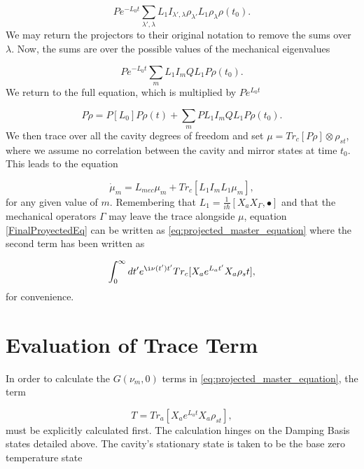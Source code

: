 \documentclass[reprint, amsmath,amssymb, aps,pra]{revtex4-1}
\begin{document}
\begin{equation}
Pe^{-L_0 t} \sum_{\lambda',\lambda} L_1 I_{\lambda',\lambda} \rho_{\lambda'} L_1 \rho_\lambda \rho(t_0).
\end{equation} We may return the projectors to their original notation to remove the sums over $\lambda$.  Now, the sums are over the possible values of the mechanical eigenvalues 

\begin{equation}
Pe^{-L_0 t} \sum_{m} L_1 I_{m} Q L_1 P \rho(t_0).
\end{equation} We return to the full equation, which is multiplied by $Pe^{L_0 t}$ 

\begin{equation}
P\dot{\rho} = P[L_0]P \rho(t) + \sum_{m} P L_1 I_{m} Q L_1 P \rho(t_0).
\end{equation} We then trace over all the cavity degrees of freedom and set  $\mu = Tr_c[P\rho]\otimes \rho_{st}$, where we assume no correlation between the cavity and mirror states at time $t_0$. This leads to the equation

\begin{equation}\label{FinalProyectedEq}
\dot{\mu}_m = L_{mec}\mu_m + Tr_c[ L_1 I_m L_1  \mu_m],
\end{equation} for any given value of $m$. Remembering that $L_1 = \frac{1}{i\hbar}[X_a X_\Gamma,\bullet]$ and that the mechanical operators $\Gamma$ may leave the trace alongside $\mu$, equation \eqref{FinalProyectedEq} can be written as \eqref{eq:projected_master_equation} where the second term has been written as

\begin{equation}
\int_0^\infty dt' e^{\i\nu(t')t'}Tr_c[X_a e^{L_a t'} X_a \rho_st], 
\end{equation} for convenience.




\section{Evaluation of Trace Term}\label{TraceAppendix}

In order to calculate the $G(\nu_m,0)$ terms in \eqref{eq:projected_master_equation}, the term

\begin{equation}\label{CoolingTrace}
T=Tr_a[X_ae^{L_at}X_a\rho_{st}],
\end{equation} must be explicitly calculated first. The calculation hinges on the Damping Basis states detailed above. The cavity's stationary state is taken to be the base zero temperature state
\end{document}
